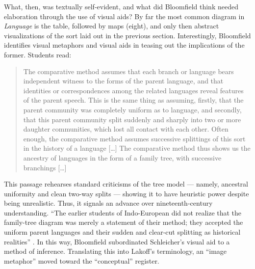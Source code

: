 \documentclass[output=paper]{langscibook}
\begin{document}
What, then, was textually self-evident, and what did Bloomfield think needed elaboration through the use of visual aids? By far the most common diagram in \emph{Language} is the table, followed by maps (eight), and only then abstract visualizations of the sort laid out in the previous section. Interestingly, Bloomfield identifies visual metaphors and visual aids in teasing out the implications of the former. Students read:

\begin{quotation}
The comparative method assumes that each branch or language bears independent witness to the forms of the parent language, and that identities or correspondences among the related languages reveal features of the parent speech. This is the same thing as assuming, firstly, that the parent community was completely uniform as to language, and secondly, that this parent community split suddenly and sharply into two or more daughter communities, which lost all contact with each other. Often enough, the comparative method assumes successive splittings of this sort in the history of a language […] The comparative method thus shows us the ancestry of languages in the form of a family tree, with successive branchings […]  \citep[311]{Bloomfield1933}
\end{quotation}

This passage rehearses standard criticisms of the tree model — namely, ancestral uniformity and clean two-way splits — showing it to have heuristic power despite being unrealistic. Thus, it signals an advance over nineteenth-century understanding. ``The earlier students of Indo-European did not realize that the family-tree diagram was merely a statement of their method; they accepted the uniform parent languages and their sudden and clear-cut splitting as historical realities'' \citep[311]{Bloomfield1933}. In this way, Bloomfield subordinated Schleicher's visual aid to a method of inference. Translating this into Lakoff's terminology, an ``image metaphor'' moved toward the ``conceptual'' register.
\end{document}
